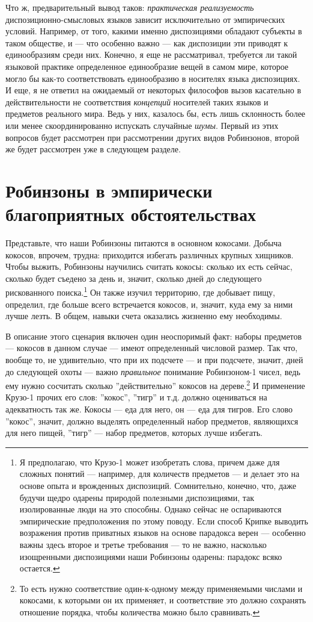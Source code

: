 \documentclass[11pt]{book}
\begin{document}
Что ж, предварительный вывод таков: \textit{практическая реализуемость} диспозиционно-смысловых языков зависит исключительно от эмпирических условий. Например, от того, какими именно диспозициями обладают субъекты в таком обществе, и --- что особенно важно --- как диспозиции эти приводят к единообразиям среди них. Конечно, я еще не рассматривал, требуется ли такой языковой практике определенное единообразие вещей в самом мире, которое могло бы как-то соответствовать единообразию в носителях языка диспозициях. И еще, я не ответил на ожидаемый от некоторых философов вызов касательно в действительности не соответствия \textit{концепций} носителей таких языков и предметов реального мира. Ведь у них, казалось бы, есть лишь склонность более или менее скоординированно испускать случайные \textit{шумы}. Первый из этих вопросов будет рассмотрен при рассмотрении других видов Робинзонов, второй же будет рассмотрен уже в следующем разделе.

\section{Робинзоны в эмпирически благоприятных обстоятельствах}

Представьте, что наши Робинзоны питаются в основном кокосами. Добыча кокосов, впрочем, трудна: приходится избегать различных крупных хищников. Чтобы выжить, Робинзоны научились считать кокосы: сколько их есть сейчас, сколько будет съедено за день и, значит, сколько дней до следующего рискованного поиска.\footnote{Я предполагаю, что Крузо-1 может изобретать слова, причем даже для сложных понятий --- например, для количеств предметов --- и делает это на основе опыта и врожденных диспозиций. Сомнительно, конечно, что, даже будучи щедро одарены природой полезными диспозициями, так изолированные люди на это способны. Однако сейчас не оспариваются эмпирические предположения по этому поводу. Если способ Крипке выводить возражения против приватных языков на основе парадокса верен --- особенно важны здесь второе и третье требования --- то не важно, насколько изощренными диспозициями наши Робинзоны одарены: парадокс всяко остается.} Он также изучил территорию, где добывает пищу, определил, где больше всего встречается кокосов, и, значит, куда ему за ними лучше лезть. В общем, навыки счета оказались жизненно ему необходимы.

В описание этого сценария включен один неоспоримый факт: наборы предметов --- кокосов в данном случае --- имеют определенный числовой размер. Так что, вообще то, не удивительно, что при их подсчете --- и при подсчете, значит, дней до следующей охоты --- важно \textit{правильное} понимание Робинзоном-1 чисел, ведь ему нужно сосчитать сколько ''действительно'' кокосов на дереве.\footnote{То есть нужно соответствие один-к-одному между применяемыми числами и кокосами, к которыми он их применяет, и соответствие это должно сохранять отношение порядка, чтобы количества можно было сравнивать.} И применение Крузо-1 прочих его слов: ''кокос'', ''тигр'' и т.д. должно оцениваться на адекватность так же. Кокосы --- еда для него, он --- еда для тигров. Его слово ''кокос'', значит, должно выделять определенный набор предметов, являющихся для него пищей, ''тигр'' --- набор предметов, которых лучше избегать.
\end{document}
